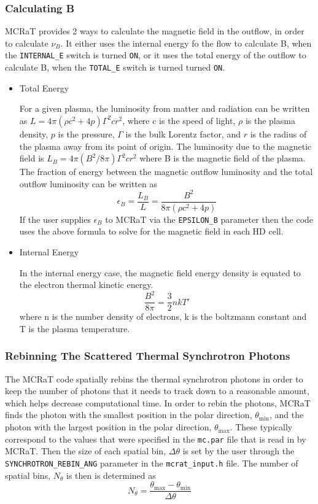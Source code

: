 \documentclass[12pt,a4paper]{article}
\begin{document}
\subsubsection{Calculating B}
MCRaT provides 2 ways to calculate the magnetic field in the outflow, in order to calculate $\nu_B$. It either uses the internal energy fo the flow to calculate B, when the \texttt{INTERNAL\_E} switch is turned \texttt{ON}, or it uses the total energy of the outflow to calculate B, when the \texttt{TOTAL\_E} switch is turned turned \texttt{ON}.
\begin{itemize}
\item Total Energy

For a given plasma, the luminosity from matter and radiation can be written as $L=4\pi(\rho c^2+4p)\Gamma^2cr^2$, where c is the speed of light, $\rho$ is the plasma density, $p$ is the pressure, $\Gamma$ is the bulk Lorentz factor, and $r$ is the radius of the plasma away from its point of origin. The luminosity due to the magnetic field is $L_B=4\pi(B^2/8\pi)\Gamma^2cr^2$ where B is the magnetic field of the plasma. The fraction of energy between the magnetic outflow luminosity and the total outflow luminosity can be written as
\begin{equation}
\epsilon_{B}=\frac{L_B}{L}=\frac{B^2}{8\pi(\rho c^2+4p)}
\end{equation}
If the user supplies $\epsilon_{B}$ to MCRaT via the \texttt{EPSILON\_B} parameter then the code uses the above formula to solve for the magnetic field in each HD cell.

\item Internal Energy

In the internal energy case, the magnetic field energy density is equated to the electron thermal kinetic energy.
\begin{equation}
\frac{B^2}{8\pi}=\frac{3}{2}nkT'
\end{equation}
where n is the number density of electrons, k is the boltzmann constant and T is the plasma temperature.
\end{itemize}

\subsubsection{Rebinning The Scattered Thermal Synchrotron Photons}
The MCRaT code spatially rebins the thermal synchrotron photons in order to keep the number of photons that it needs to track down to a reasonable amount, which helps decrease computational time. In order to rebin the photons, MCRaT finds the photon with the smallest position in the polar direction, $\theta_\mathrm{min}$,  and the photon with the largest position in the polar direction, $\theta_\mathrm{max}$. These typically correspond to the values that were specified in the \texttt{mc.par} file that is read in by MCRaT. Then the size of each spatial bin, $\Delta \theta$ is set by the user through the \texttt{SYNCHROTRON\_REBIN\_ANG} parameter in the \texttt{mcrat\_input.h} file. The number of spatial bins, $N_\theta$ is then is determined as
\begin{equation}
N_\theta=\frac{\theta_\mathrm{max}-\theta_\mathrm{min}}{\Delta \theta}
\end{equation}
\end{document}
